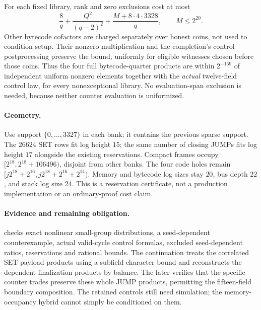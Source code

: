 For each fixed library, rank and zero exclusions cost at most
\[
 \frac8q+\frac{Q^2}{(q-2)^2}+\frac{M+8\cdot4\cdot3328}{q},\qquad M\le2^{20}.
\]
Other bytecode cofactors are charged separately over honest coins, not used to condition setup. Their nonzero multiplication and the completion's control postprocessing preserve the bound, uniformly for eligible witnesses chosen before those coins. Thus the four full bytecode-quarter products are within $2^{-159}$ of independent uniform nonzero elements together with the \emph{actual} twelve-field control law, for every nonexceptional library. No evaluation-span exclusion is needed, because neither counter evaluation is uniformized.

\paragraph{Geometry.} Use support $\{0,\ldots,3327\}$ in each bank; it contains the previous sparse support. The $26624$ SET rows fit log height $15$; the same number of closing JUMPs fits log height $17$ alongside the existing reservations. Compact frames occupy $[2^{18},2^{18}+106496)$, disjoint from other banks. The four code holes remain $[j2^{18}+2^{16},j2^{18}+2^{16}+2^{14})$. Memory and bytecode log sizes stay $20$, bus depth $22$, and stack log size $24$. This is a reservation certificate, not a production implementation or an ordinary-proof cost claim.

\paragraph{Evidence and remaining obligation.}  checks exact nonlinear small-group distributions, a seed-dependent counterexample, actual valid-cycle control formulas, excluded seed-dependent ratios, reservations and rational bounds. The continuation  treats the correlated SET payload products using a subfield character bound and reconstructs the dependent finalization products by balance. The later  verifies that the specific counter trades preserve these whole JUMP products, permitting the fifteen-field boundary composition. The retained controls still need simulation; the memory-occupancy hybrid cannot simply be conditioned on them.
